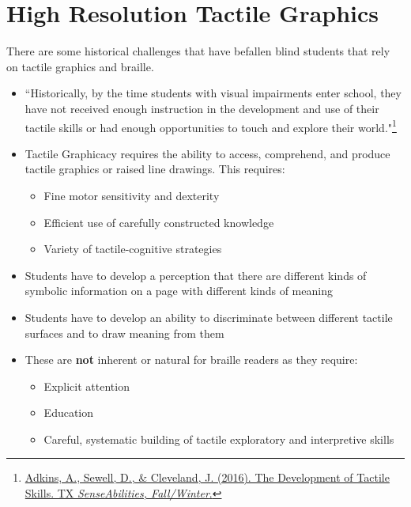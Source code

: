\pagebreak
\hypertarget{tactile-graphics-high-resolution-complex-graphics}{}\section{High Resolution Tactile Graphics}\label{tactile-graphics-high-resolution-complex-graphics}
There are some historical challenges that have befallen blind students that rely on tactile graphics and braille.
\begin{itemize}[leftmargin=*]
	\item ``Historically, by the time students with visual impairments enter school, they have not received enough instruction in the development and use of their tactile skills or had enough opportunities to touch and explore their world."\footnote{\raggedright \href{http://www.tsbvi.edu/tx-senseabilities/issues/fall-winter-2016/the-development-of-tactile-skills}{Adkins, A., Sewell, D., \& Cleveland, J. (2016). The Development of Tactile Skills. TX \textit{SenseAbilities, Fall/Winter}.}}
	\item Tactile Graphicacy requires the ability to access, comprehend, and produce tactile graphics or raised line drawings. This requires:\begin{itemize}
		      \item Fine motor sensitivity and dexterity
		      \item Efficient use of carefully constructed knowledge
		      \item Variety of tactile-cognitive strategies
	      \end{itemize}
	\item Students have to develop a perception that there are different kinds of symbolic information on a page with different kinds of meaning
	\item Students have to develop an ability to discriminate between different tactile surfaces and to draw meaning from them
	\item These are \textbf{not} inherent or natural for braille readers as they require:
	      \begin{itemize}
		      \item Explicit attention
		      \item Education
		      \item Careful, systematic building of tactile exploratory and interpretive skills
	      \end{itemize}

\end{itemize}


